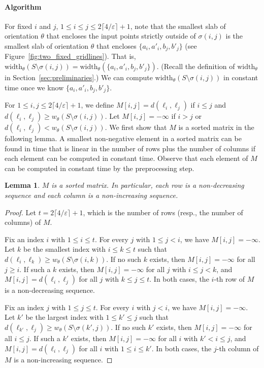 \documentclass[10pt,a4paper]{article}
\newtheorem{lemma}[theorem]{Lemma}
\theoremstyle{star}
\theoremstyle{claimstar}
\newcommand{\eps}{\ensuremath{\varepsilon}}
\newcommand{\width}{\ensuremath{\mathrm{width}}}
\begin{document}
\paragraph*{Algorithm} 
For fixed $i$ and $j$, $ 1 \le i \le j \le 2\lceil 4/\eps \rceil +1  $, note that the smallest slab of orientation $\theta$ that encloses the input points strictly outside of $\sigma(i, j)$ is the smallest slab of orientation $\theta$ that encloses $\{a_i, a'_i, b_j, b'_j \}$ (see Figure~\ref{fig:two_fixed_gridlines}). 
That is, $\width_\theta(S \setminus \sigma(i, j)) = \width_\theta (\{a_i, a'_i, b_j, b'_j \})$.
(Recall the definition of $\width_\theta$ in Section~\ref{sec:preliminaries}.)
We can compute $\width_\theta(S \setminus \sigma(i, j))$ in constant time once we know $\{a_i, a'_i, b_j, b'_j \}$. 

For  $  1 \le i, j \le 2\lceil 4/\eps \rceil +1$, 
we define $M[i, j] = d(\ell_i, \ell_j)$ if $i\le j$ and 
$d(\ell_i, \ell_j) \ge w_\theta(S \setminus \sigma(i, j))$. 
Let $M[i, j] = -\infty$ if $i>j$ or $d(\ell_i, \ell_j) < w_\theta(S \setminus \sigma(i, j))$. 
We first show that $M$ is a sorted matrix in the following lemma. 
A smallest non-negative element in a sorted matrix can be found in time that is linear in the number of rows plus the number of columns if each element can be computed in constant time.
Observe that each element of $M$ can be computed in constant time by the preprocessing step. 


\begin{lemma}
    $M$ is a sorted matrix. In particular, each row is a non-decreasing sequence and each column is a non-increasing sequence. 
\end{lemma}
\begin{proof}

    Let $t = 2\lceil 4/\eps \rceil + 1$, which is the number of rows (resp., the number of columns) of $M$.

    Fix an index $i$ with $1 \le i \le t$.  
    For every $j$ with $1 \le j < i$, we have $M[i,j] = -\infty$.
    Let $k$ be the smallest index with $i \le k \le t$ such that $d(\ell_i, \ell_k) \ge w_\theta(S \setminus \sigma(i,k))$.  
    If no such $k$ exists, then $M[i,j] = -\infty$ for all $j \ge i$.  
    If such a $k$ exists, then $M[i,j] = -\infty$ for all $j$ with $i \le j < k$, and $M[i,j] = d(\ell_i, \ell_j)$ for all $j$ with $k \le j \le t$.  
    In both cases, the $i$-th row of $M$ is a non-decreasing sequence.
    
    Fix an index $j$ with $1 \le j \le t$.  
    For every $i$ with $j < i$, we have $M[i,j] = -\infty$.
    Let $k'$ be the largest index with $1 \le k' \le j$ such that $d(\ell_{k'}, \ell_j) \ge w_\theta(S \setminus \sigma(k',j))$.  
    If no such $k'$ exists, then $M[i,j] = -\infty$ for all $i \le j$.  
    If such a $k'$ exists, then $M[i,j] = -\infty$ for all $i$ with $k' < i \le j$, and $M[i,j] = d(\ell_i, \ell_j)$ for all $i$ with $1 \le i \le k'$.  
    In both cases, the $j$-th column of $M$ is a non-increasing sequence.
\end{proof}
\end{document}
